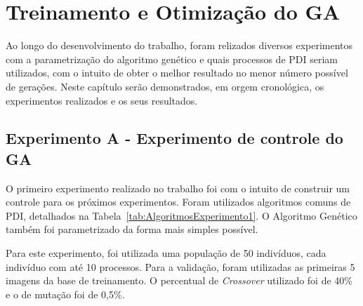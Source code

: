 \documentclass[12pt,oneside,a4paper,english,french,spanish,brazil,]{abntex2}
\begin{document}
\section{Treinamento e Otimização do GA}

Ao longo do desenvolvimento do trabalho, foram relizados diversos experimentos com a parametrização do algoritmo genético e quais processos de PDI seriam utilizados, com o intuito de obter o melhor resultado no menor número possível de gerações. Neste capítulo serão demonstrados, em orgem cronológica, os experimentos realizados e os seus resultados.

\subsection{Experimento A - Experimento de controle do GA}

O primeiro experimento realizado no trabalho foi com o intuito de construir um controle para os próximos experimentos. Foram utilizados algoritmos comuns de PDI, detalhados na Tabela~\ref{tab:AlgoritmosExperimento1}. O Algoritmo Genético também foi parametrizado da forma mais simples possível. 

Para este experimento, foi utilizada uma população de 50 indivíduos, cada indivíduo com até 10 processos. Para a validação, foram utilizadas as primeiras 5 imagens da base de treinamento. O percentual de \textit{Crossover} utilizado foi de 40\% e o de mutação foi de 0,5\%.
\end{document}
